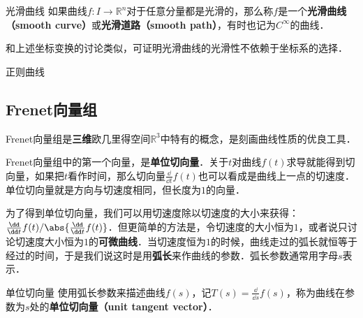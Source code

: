 \begin{definition}{光滑曲线}
如果曲线$f:I\to\mathbb{R}^n$对于任意分量都是光滑的，那么称$f$是一个\textbf{光滑曲线（smooth curve）}或\textbf{光滑道路（smooth path）}，有时也记为$C^\infty$的曲线．
\end{definition}

和上述坐标变换的讨论类似，可证明光滑曲线的光滑性不依赖于坐标系的选择．

\begin{definition}{正则曲线}

\end{definition}

\subsection{Frenet向量组}

Frenet向量组是\textbf{三维}欧几里得空间$\mathbb{R}^3$中特有的概念，是刻画曲线性质的优良工具．

Frenet向量组中的第一个向量，是\textbf{单位切向量}．关于$t$对曲线$f(t)$求导就能得到切向量，如果把$t$看作时间，那么切向量$\frac{\dd}{\dd t}f(t)$也可以看成是曲线上一点的切速度．单位切向量就是方向与切速度相同，但长度为$1$的向量．

为了得到单位切向量，我们可以用切速度除以切速度的大小来获得：$\frac{\dd}{\dd t}f(t)/\abs{\frac{\dd}{\dd t}f(t)}$．但更简单的方法是，令切速度的大小恒为$1$，或者说只讨论切速度大小恒为$1$的\textbf{可微曲线}．当切速度恒为$1$的时候，曲线走过的弧长就恒等于经过的时间，于是我们说这时是用\textbf{弧长}来作曲线的参数．弧长参数通常用字母$s$表示．

\begin{definition}{单位切向量}
使用弧长参数来描述曲线$f(s)$，记$T(s)=\frac{\dd}{\dd s}f(s)$，称为曲线在参数为$s$处的\textbf{单位切向量（unit tangent vector）}．
\end{definition}








